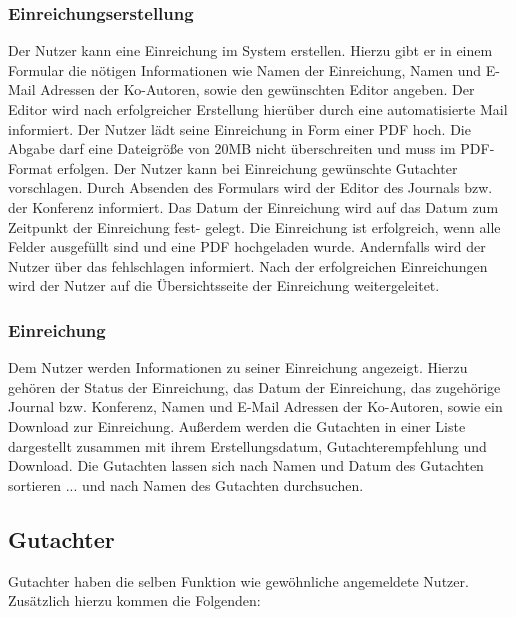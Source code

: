 \subsubsection{Einreichungserstellung}
\begin{description}
     Der Nutzer kann eine Einreichung im System erstellen. Hierzu gibt er in einem
    Formular die nötigen Informationen wie Namen der Einreichung, Namen und E-Mail Adressen der Ko-Autoren,
    sowie den gewünschten Editor angeben. Der Editor wird nach erfolgreicher Erstellung hierüber durch eine
    automatisierte Mail informiert.
     Der Nutzer lädt seine Einreichung in Form einer PDF hoch. Die Abgabe darf eine Dateigröße
    von 20MB nicht überschreiten und muss im PDF-Format erfolgen.
     Der Nutzer kann bei Einreichung gewünschte Gutachter vorschlagen.
     Durch Absenden des Formulars wird der Editor des Journals bzw. der Konferenz
    informiert. Das Datum der Einreichung wird auf das Datum zum Zeitpunkt der Einreichung fest-
    gelegt.
     Die Einreichung ist erfolgreich, wenn alle Felder ausgefüllt sind und eine PDF
    hochgeladen wurde. Andernfalls wird der Nutzer über das fehlschlagen informiert.
     Nach der erfolgreichen Einreichungen wird der Nutzer auf die Übersichtsseite der
    Einreichung weitergeleitet.
\end{description}

\subsubsection{Einreichung}
\begin{description}
     Dem Nutzer werden Informationen zu seiner Einreichung angezeigt.
    Hierzu gehören der Status der Einreichung, das Datum der Einreichung, das zugehörige
    Journal bzw. Konferenz, Namen und E-Mail Adressen der Ko-Autoren, sowie ein Download zur Einreichung.
     Außerdem werden die Gutachten in einer
    Liste dargestellt zusammen mit ihrem Erstellungsdatum, Gutachterempfehlung und Download. %
    \XXitem{} Die Gutachten lassen sich nach Namen und Datum
    des Gutachten sortieren
    ... und nach Namen des Gutachten durchsuchen.
\end{description}

\subsection{Gutachter}
Gutachter haben die selben Funktion wie gewöhnliche angemeldete Nutzer. Zusätzlich hierzu kommen
die Folgenden:

